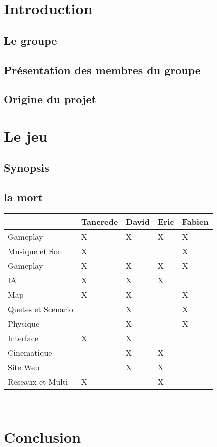 \documentclass[12pt,a4paper]{article}
\begin{document}
\thispagestyle{empty}
\tableofcontents
	
\newpage
\section{Introduction}
\subsection{Le groupe}
\subsection{Présentation des membres du groupe}
\subsection{Origine du projet}
\newpage
\section{Le jeu}
\subsection{Synopsis}
\newpage
\subsection{la mort}

\newpage
\begin{tabular}{|R{3.5cm}||C{1.5cm}|C{1.5cm}|C{1.5cm}|C{1.5cm}|}
\hline  & Tancrede & David & Eric & Fabien\\
\hline  Gameplay & X & X & X & X \\
\hline  Musique et Son & X &  &  & X\\
\hline  Gameplay & X & X & X & X\\
\hline  IA & X & X & X &   \\
\hline  Map & X & X &  & X  \\
\hline  Quetes et Scenario &  & X &  & X\\
\hline  Physique &  & X &  & X \\
\hline  Interface & X & X &  &  \\
\hline  Cinematique &  & X & X &  \\
\hline  Site Web &  & X & X &  \\
\hline  Reseaux et Multi & X &  & X &  \\
\hline  
\end{tabular}\\ 





\newpage

\section{Conclusion}
	
	
	




	
\end{document}
